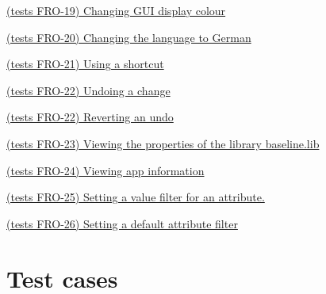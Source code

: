 \documentclass[10pt,a4paper]{report}
\newcommand{\refer}[2]{\hyperref[#1]{\textcolor{col:reference}{#2}}}
\begin{document}
\begin{GTCO}
    \item  \refer{GTCO-22}{(tests FRO-19) Changing GUI display colour}
    \item  \refer{GTCO-23}{(tests FRO-20) Changing the language to German}
    \item  \refer{GTCO-24}{(tests FRO-21) Using a shortcut}
    \item  \refer{GTCO-25}{(tests FRO-22) Undoing a change}
    \item  \refer{GTCO-26}{(tests FRO-22) Reverting an undo}
    \item  \refer{GTCO-27}{(tests FRO-23) Viewing the properties of the library baseline.lib}
    \item  \refer{GTCO-28}{(tests FRO-24) Viewing app information}
    \item  \refer{GTCO-29}{(tests FRO-25) Setting a value filter for an attribute.}
    \item  \refer{GTCO-30}{(tests FRO-26) Setting a default attribute filter}
    
\end{GTCO}

\section{Test cases}

  
\end{document}
